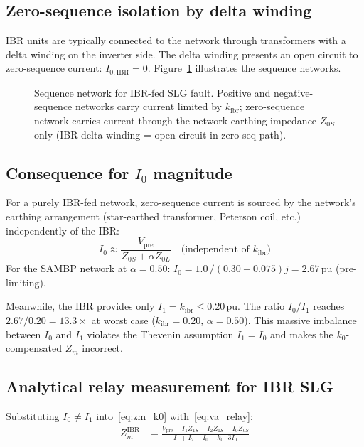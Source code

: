 \documentclass[11pt,a4paper]{article}
\begin{document}
\subsection{Zero-sequence isolation by delta winding}

IBR units are typically connected to the network through transformers with a
delta winding on the inverter side.  The delta winding presents an open circuit
to zero-sequence current: $I_{0,\mathrm{IBR}} = 0$.  Figure~\ref{fig:network}
illustrates the sequence networks.

\begin{figure}[h!]
\centering
\caption{%
  Sequence network for IBR-fed SLG fault.  Positive and negative-sequence
  networks carry current limited by $k_\mathrm{ibr}$; zero-sequence network
  carries current through the network earthing impedance $Z_{0S}$ only
  (IBR delta winding = open circuit in zero-seq path).}
\label{fig:network}

\end{figure}

\subsection{Consequence for \texorpdfstring{$I_0$}{I0} magnitude}

For a purely IBR-fed network, zero-sequence current is sourced by the network's
earthing arrangement (star-earthed transformer, Peterson coil, etc.) independently
of the IBR:
\begin{equation}
  I_0 \approx \frac{V_\mathrm{pre}}{Z_{0S} + \alpha Z_{0L}} \quad
  \text{(independent of }k_\mathrm{ibr}\text{)}
  \label{eq:I0_network}
\end{equation}
For the SAMBP network at $\alpha=0.50$:
$I_0 = 1.0\,/(0.30+0.075)j = 2.67\,\mathrm{pu}$ (pre-limiting).

Meanwhile, the IBR provides only $I_1 = k_\mathrm{ibr} \leq 0.20$\,pu.  The ratio
$I_0/I_1$ reaches $2.67/0.20 = 13.3\times$ at worst case ($k_\mathrm{ibr}=0.20$,
$\alpha=0.50$).  This massive imbalance between $I_0$ and $I_1$ violates the
Thevenin assumption $I_1 = I_0$ and makes the $k_0$-compensated $Z_m$ incorrect.

\subsection{Analytical relay measurement for IBR SLG}

Substituting $I_0 \neq I_1$ into~\eqref{eq:zm_k0} with~\eqref{eq:va_relay}:
\begin{align}
  Z_m^{\mathrm{IBR}} &= \frac{V_\mathrm{pre} - I_1 Z_{1S} - I_2 Z_{1S} - I_0 Z_{0S}}
                           {I_1 + I_2 + I_0 + k_0\cdot 3I_0}
  \label{eq:zm_ibr}
\end{align}
\end{document}
